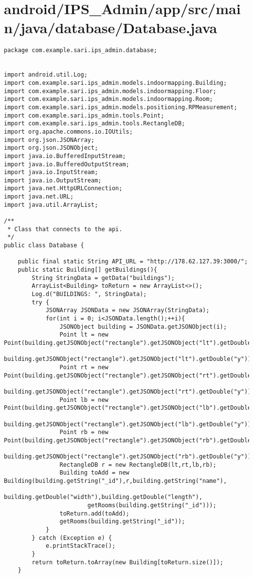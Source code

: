 \section{android/IPS\_Admin/app/src/main/java/database/Database.java}
\begin{lstlisting}package com.example.sari.ips_admin.database;


import android.util.Log;
import com.example.sari.ips_admin.models.indoormapping.Building;
import com.example.sari.ips_admin.models.indoormapping.Floor;
import com.example.sari.ips_admin.models.indoormapping.Room;
import com.example.sari.ips_admin.models.positioning.RPMeasurement;
import com.example.sari.ips_admin.tools.Point;
import com.example.sari.ips_admin.tools.RectangleDB;
import org.apache.commons.io.IOUtils;
import org.json.JSONArray;
import org.json.JSONObject;
import java.io.BufferedInputStream;
import java.io.BufferedOutputStream;
import java.io.InputStream;
import java.io.OutputStream;
import java.net.HttpURLConnection;
import java.net.URL;
import java.util.ArrayList;

/**
 * Class that connects to the api.
 */
public class Database {

    public final static String API_URL = "http://178.62.127.39:3000/";
    public static Building[] getBuildings(){
        String StringData = getData("buildings");
        ArrayList<Building> toReturn = new ArrayList<>();
        Log.d("BUILDINGS: ", StringData);
        try {
            JSONArray JSONData = new JSONArray(StringData);
            for(int i = 0; i<JSONData.length();++i){
                JSONObject building = JSONData.getJSONObject(i);
                Point lt = new Point(building.getJSONObject("rectangle").getJSONObject("lt").getDouble("x"),
                                     building.getJSONObject("rectangle").getJSONObject("lt").getDouble("y"));
                Point rt = new Point(building.getJSONObject("rectangle").getJSONObject("rt").getDouble("x"),
                                     building.getJSONObject("rectangle").getJSONObject("rt").getDouble("y"));
                Point lb = new Point(building.getJSONObject("rectangle").getJSONObject("lb").getDouble("x"),
                                     building.getJSONObject("rectangle").getJSONObject("lb").getDouble("y"));
                Point rb = new Point(building.getJSONObject("rectangle").getJSONObject("rb").getDouble("x"),
                                     building.getJSONObject("rectangle").getJSONObject("rb").getDouble("y"));
                RectangleDB r = new RectangleDB(lt,rt,lb,rb);
                Building toAdd = new Building(building.getString("_id"),r,building.getString("name"),
                        building.getDouble("width"),building.getDouble("length"),
                        getRooms(building.getString("_id")));
                toReturn.add(toAdd);
                getRooms(building.getString("_id"));
            }
        } catch (Exception e) {
            e.printStackTrace();
        }
        return toReturn.toArray(new Building[toReturn.size()]);
    }


\end{lstlisting}
